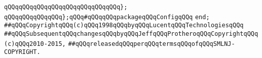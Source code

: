 \verb|qQQqqQQqqQQqqQQqqQQqqQQqqQQqqQQq};|\newline
\newline
\verb|qQQqqQQqqQQqqQQq};qQQq#qQQqqQQqpackageqQQqConfigqQQq|\newline
\verb|end;|\newline
\newline
\verb|##qQQqCopyrightqQQq(c)qQQq1998qQQqbyqQQqLucentqQQqTechnologiesqQQq|\newline
\verb|##qQQqSubsequentqQQqchangesqQQqbyqQQqJeffqQQqProtheroqQQqCopyrightqQQq(c)qQQq2010-2015,|\newline
\verb|##qQQqreleasedqQQqperqQQqtermsqQQqofqQQqSMLNJ-COPYRIGHT.|\newline

